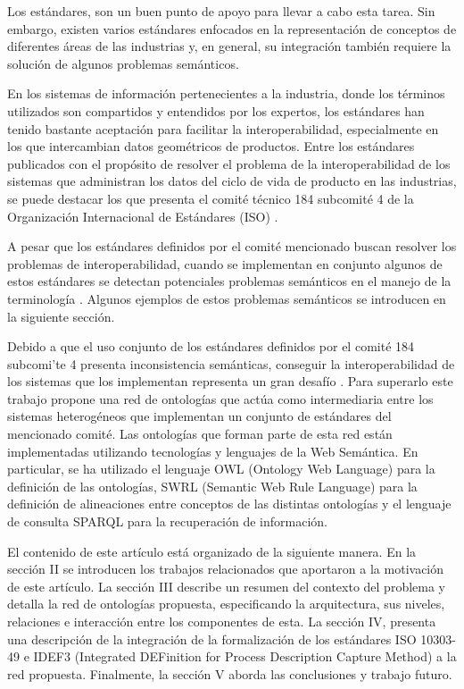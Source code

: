 \documentclass[journal]{IEEEtran}
\begin{document}
Los est\'andares, son un buen punto de apoyo para llevar a cabo esta tarea. Sin embargo, existen varios est\'andares enfocados en la representaci\'on de conceptos de diferentes \'areas de las industrias y, en general, su integraci\'on tambi\'en requiere la soluci\'on de algunos problemas sem\'anticos. 

En los sistemas de informaci\'on pertenecientes a la industria, donde los t\'erminos utilizados son compartidos y entendidos por los expertos, los est\'andares han tenido bastante aceptaci\'on para facilitar la interoperabilidad, especialmente en los que intercambian datos geom\'etricos de productos. Entre los est\'andares publicados con el prop\'osito de resolver el problema de la interoperabilidad de los sistemas que administran los datos del ciclo de vida de producto en las industrias, se puede destacar los que presenta el comit\'e t\'ecnico 184 subcomit\'e 4 de la Organizaci\'on Internacional de Est\'andares (ISO) \cite{Cutting-Decelle2007}. 

A pesar que los est\'andares definidos por el comit\'e mencionado buscan resolver los problemas de interoperabilidad, cuando se implementan en conjunto algunos de estos est\'andares se detectan potenciales problemas sem\'anticos en el manejo de la terminolog\'ia \cite{Young2007}. Algunos ejemplos de estos problemas sem\'anticos se introducen en la siguiente secci\'on. 

Debido a que el uso conjunto de los estándares definidos por el comité 184 subcomi'te 4 presenta inconsistencia semánticas, conseguir la interoperabilidad de los sistemas que los implementan representa un gran desafío  \cite{Fortineau2013}. Para superarlo este trabajo propone una red de ontolog\'ias que act\'ua como intermediaria entre los sistemas heterog\'eneos que implementan un conjunto de est\'andares del mencionado comit\'e. Las ontolog\'ias que forman parte de esta red est\'an implementadas utilizando tecnolog\'ias y lenguajes de la Web Sem\'antica. En particular, se ha utilizado el lenguaje OWL (Ontology Web Language) para la definici\'on de las ontolog\'ias, SWRL (Semantic Web Rule Language) para la definici\'on de alineaciones entre conceptos de las distintas ontolog\'ias y el lenguaje de consulta SPARQL para la recuperaci\'on de informaci\'on.

El contenido de este art\'iculo est\'a organizado de la siguiente manera. En la secci\'on II se introducen los trabajos relacionados que aportaron a la motivaci\'on de este art\'iculo. La secci\'on III describe un resumen del contexto del problema y detalla la red de ontolog\'ias propuesta, especificando la arquitectura, sus niveles, relaciones e interacci\'on entre los componentes de esta. La secci\'on IV, presenta una descripci\'on de la integraci\'on de la formalizaci\'on de los est\'andares ISO 10303-49 e IDEF3 (Integrated DEFinition for Process Description Capture Method) a la red propuesta. Finalmente, la secci\'on V aborda las conclusiones y trabajo futuro.
\end{document}
